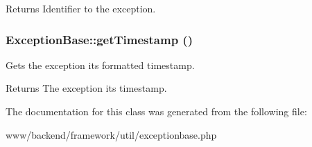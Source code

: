 \begin{DoxyReturn}{Returns}
Identifier to the exception. 
\end{DoxyReturn}
\hypertarget{classExceptionBase_a08d8c6269e0157deb4e90aa4353a7bb5}{
\subsubsection[{getTimestamp}]{\setlength{\rightskip}{0pt plus 5cm}ExceptionBase::getTimestamp ()}}
\label{classExceptionBase_a08d8c6269e0157deb4e90aa4353a7bb5}
Gets the exception its formatted timestamp.

\begin{DoxyReturn}{Returns}
The exception its timestamp. 
\end{DoxyReturn}


The documentation for this class was generated from the following file:\begin{DoxyCompactItemize}
\item 
www/backend/framework/util/exceptionbase.php\end{DoxyCompactItemize}
